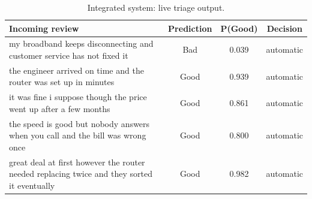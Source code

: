 \begin{table}[H]
\centering
\footnotesize
\caption{Integrated system: live triage output.}
\label{tab:demotriage}
\begin{tabular}{p{8.6cm}ccc}
\toprule
Incoming review & Prediction & P(Good) & Decision \\
\midrule
my broadband keeps disconnecting and customer service has not fixed it & Bad & 0.039 & automatic \\
the engineer arrived on time and the router was set up in minutes & Good & 0.939 & automatic \\
it was fine i suppose though the price went up after a few months & Good & 0.861 & automatic \\
the speed is good but nobody answers when you call and the bill was wrong once & Good & 0.800 & automatic \\
great deal at first however the router needed replacing twice and they sorted it eventually & Good & 0.982 & automatic \\
\bottomrule
\end{tabular}
\end{table}